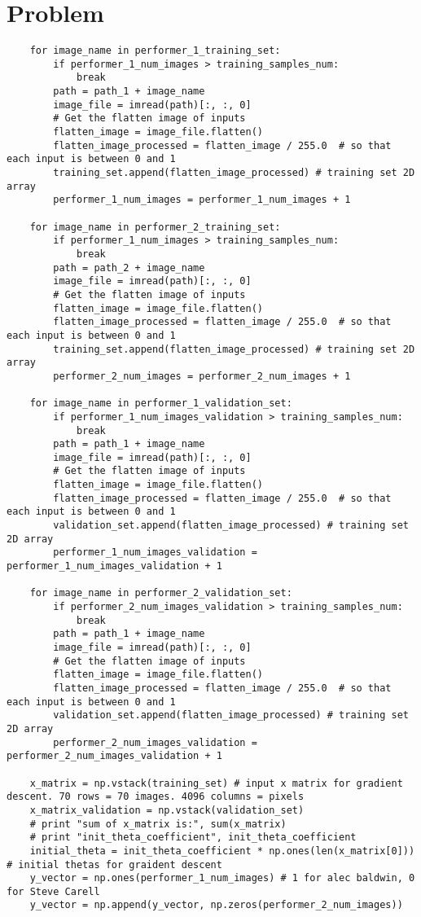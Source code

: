 \documentclass{article}
\newcommand{\enterProblemHeader}[1]{
}
\newcommand{\exitProblemHeader}[1]{
}
\newcounter{homeworkProblemCounter} %
\newcommand{\homeworkProblemName}{}
\newenvironment{homeworkProblem}[1][Problem \arabic{homeworkProblemCounter}]{ %
\stepcounter{homeworkProblemCounter} %
\renewcommand{\homeworkProblemName}{#1} %
\section{\homeworkProblemName} %
\enterProblemHeader{\homeworkProblemName} %
}{
\exitProblemHeader{\homeworkProblemName} %
}
\begin{document}
\begin{homeworkProblem}
\begin{lstlisting}
    for image_name in performer_1_training_set:
        if performer_1_num_images > training_samples_num:
            break
        path = path_1 + image_name
        image_file = imread(path)[:, :, 0]
        # Get the flatten image of inputs
        flatten_image = image_file.flatten()
        flatten_image_processed = flatten_image / 255.0  # so that each input is between 0 and 1
        training_set.append(flatten_image_processed) # training set 2D array
        performer_1_num_images = performer_1_num_images + 1

    for image_name in performer_2_training_set:
        if performer_1_num_images > training_samples_num:
            break
        path = path_2 + image_name
        image_file = imread(path)[:, :, 0]
        # Get the flatten image of inputs
        flatten_image = image_file.flatten()
        flatten_image_processed = flatten_image / 255.0  # so that each input is between 0 and 1
        training_set.append(flatten_image_processed) # training set 2D array
        performer_2_num_images = performer_2_num_images + 1

    for image_name in performer_1_validation_set:
        if performer_1_num_images_validation > training_samples_num:
            break
        path = path_1 + image_name
        image_file = imread(path)[:, :, 0]
        # Get the flatten image of inputs
        flatten_image = image_file.flatten()
        flatten_image_processed = flatten_image / 255.0  # so that each input is between 0 and 1
        validation_set.append(flatten_image_processed) # training set 2D array
        performer_1_num_images_validation = performer_1_num_images_validation + 1

    for image_name in performer_2_validation_set:
        if performer_2_num_images_validation > training_samples_num:
            break
        path = path_1 + image_name
        image_file = imread(path)[:, :, 0]
        # Get the flatten image of inputs
        flatten_image = image_file.flatten()
        flatten_image_processed = flatten_image / 255.0  # so that each input is between 0 and 1
        validation_set.append(flatten_image_processed) # training set 2D array
        performer_2_num_images_validation = performer_2_num_images_validation + 1

    x_matrix = np.vstack(training_set) # input x matrix for gradient descent. 70 rows = 70 images. 4096 columns = pixels
    x_matrix_validation = np.vstack(validation_set)
    # print "sum of x_matrix is:", sum(x_matrix)
    # print "init_theta_coefficient", init_theta_coefficient
    initial_theta = init_theta_coefficient * np.ones(len(x_matrix[0])) # initial thetas for graident descent
    y_vector = np.ones(performer_1_num_images) # 1 for alec baldwin, 0 for Steve Carell
    y_vector = np.append(y_vector, np.zeros(performer_2_num_images))


\end{lstlisting}
\end{homeworkProblem}
\end{document}

